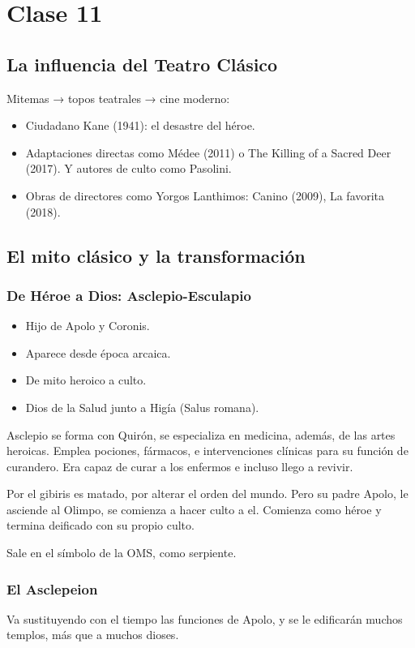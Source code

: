 \chapter{Clase 11}\label{ch:clase11}
\section{La influencia del Teatro Clásico}
Mitemas → topos teatrales → cine moderno:
\begin{itemize}
	\item Ciudadano Kane (1941): el desastre del héroe.
	\item Adaptaciones directas como Médee (2011) o The Killing of a Sacred Deer (2017). Y autores de culto como Pasolini.
	\item Obras de directores como Yorgos Lanthimos: Canino (2009), La favorita (2018).
\end{itemize}

\section{El mito clásico y la transformación}

\subsection{De Héroe a Dios: Asclepio-Esculapio}
\begin{itemize}
	\item Hijo de Apolo y Coronis.
	\item Aparece desde época arcaica.
	\item De mito heroico a culto.
	\item Dios de la Salud junto a Higía (Salus romana).
\end{itemize}

Asclepio se forma con Quirón, se especializa en medicina, además, de las artes heroicas. Emplea  pociones, fármacos, e intervenciones clínicas para su función de curandero. Era capaz de curar a los enfermos e incluso llego a revivir.

Por el gibiris es matado, por alterar el orden del mundo. Pero su padre Apolo, le asciende al Olimpo, se comienza a hacer culto a el. Comienza como héroe y termina deificado con su propio culto.

Sale en el símbolo de la OMS, como serpiente.

\subsection{El Asclepeion}
Va sustituyendo con el tiempo las funciones de Apolo, y se le edificarán muchos templos, más que a muchos dioses.

